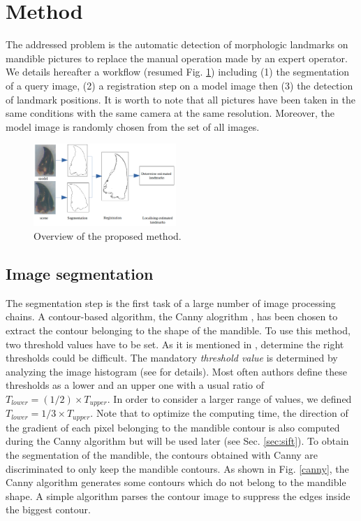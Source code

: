 \documentclass[twoside,twocolumn,10pt]{article}
\begin{document}
\section{Method}
\label{sec:method}

The addressed problem is the automatic detection of morphologic landmarks on mandible pictures to replace the manual operation made by an expert operator.
We details hereafter a workflow (resumed Fig. \ref{fig:method}) including (1) the segmentation of a query image, (2) a registration step on a model image then (3) the detection of landmark positions.
It is worth to note that all pictures have been taken in the same conditions with the same camera at the same resolution.
Moreover, the model image is randomly chosen from the set of all images.

\begin{figure}[htbp]
    \centering
    \includegraphics[width=0.48\textwidth]{./images/method}
    \caption{Overview of the proposed method.}
    \label{fig:method}
\end{figure}

\subsection{Image segmentation}
\label{sec:segmentation}

The segmentation step is the first task of a large number of image processing chains.
A contour-based algorithm, the Canny alogrithm \cite{canny1986computational}, has been chosen to extract the contour belonging to the shape of the mandible.
To use this method, two threshold values have to be set.
As it is mentioned in \cite{adaptiveCanny}, determine the right thresholds could be difficult.
The mandatory \textit{threshold value} is determined by analyzing the image histogram (see \cite{leestimating} for details).
Most often authors define these thresholds as a lower and an upper one with a usual ratio of $T_{lower} = (1/2) \times T_{upper}$.
In order to consider a larger range of values, we defined $T_{lower} = 1/3 \times T_{upper}$.
Note that to optimize the computing time, the direction of the gradient of each pixel belonging to the mandible contour is also computed during the Canny algorithm but will be used later (see Sec. \ref{sec:sift}).
To obtain the segmentation of the mandible, the contours obtained with Canny are discriminated to only keep the mandible contours.
As shown in Fig. \ref{canny}, the Canny algorithm generates some contours which do not belong to the mandible shape.
A simple algorithm parses the contour image to suppress the edges inside the biggest contour.
\end{document}
